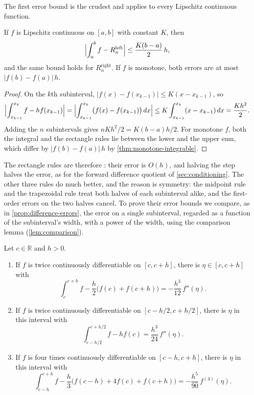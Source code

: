 The first error bound is the crudest and applies to every Lipschitz continuous function.

\begin{proposition}
\label{prop:rectangle-error}
If $f$ is Lipschitz continuous on $[a,b]$ with constant $K$, then
\[
\Bigl|\int_a^bf-R^{\mathrm{left}}_n\Bigr|\le\frac{K(b-a)}2\,h,
\]
and the same bound holds for $R^{\mathrm{right}}_n$. If $f$ is monotone, both errors are at most $|f(b)-f(a)|\,h$.
\end{proposition}

\begin{proof}
On the $k$th subinterval, $|f(x)-f(x_{k-1})|\le K(x-x_{k-1})$, so
\[
\Bigl|\int_{x_{k-1}}^{x_k}f-hf(x_{k-1})\Bigr|=\Bigl|\int_{x_{k-1}}^{x_k}\bigl(f(x)-f(x_{k-1})\bigr)\,dx\Bigr|\le K\int_{x_{k-1}}^{x_k}(x-x_{k-1})\,dx=\frac{Kh^2}2 .
\]
Adding the $n$ subintervals gives $nKh^2/2=K(b-a)h/2$. For monotone $f$, both the integral and the rectangle rules lie between the lower and the upper sum, which differ by $|f(b)-f(a)|\,h$ by \cref{thm:monotone-integrable}.
\end{proof}

The rectangle rules are therefore : their error is $O(h)$, and halving the step halves the error, as for the forward difference quotient of \cref{sec:conditioning}. The other three rules do much better, and the reason is symmetry: the midpoint rule and the trapezoidal rule treat both halves of each subinterval alike, and the first-order errors on the two halves cancel. To prove their error bounds we compare, as in \cref{prop:difference-errors}, the error on a single subinterval, regarded as a function of the subinterval's width, with a power of the width, using the comparison lemma (\cref{lem:comparison}).

\begin{lemma}
\label{lem:local-errors}
Let $c\in\mathbb R$ and $h>0$.
\begin{enumerate}
\item If $f$ is twice continuously differentiable on $[c,c+h]$, there is $\eta\in[c,c+h]$ with
\[
\int_c^{c+h}f-\frac h2\bigl(f(c)+f(c+h)\bigr)=-\frac{h^3}{12}\,f''(\eta).
\]
\item If $f$ is twice continuously differentiable on $[c-h/2,c+h/2]$, there is $\eta$ in this interval with
\[
\int_{c-h/2}^{c+h/2}f-hf(c)=\frac{h^3}{24}\,f''(\eta).
\]
\item If $f$ is four times continuously differentiable on $[c-h,c+h]$, there is $\eta$ in this interval with
\[
\int_{c-h}^{c+h}f-\frac h3\bigl(f(c-h)+4f(c)+f(c+h)\bigr)=-\frac{h^5}{90}\,f^{(4)}(\eta).
\]
\end{enumerate}
\end{lemma}

